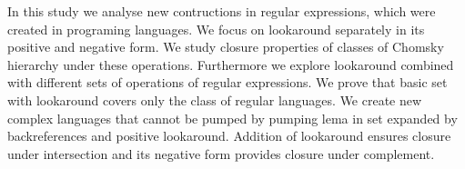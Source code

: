 \null
In this study we analyse new contructions in regular expressions, which were created in programing languages. We focus on lookaround separately in its positive and negative form. We study closure properties of classes of Chomsky hierarchy under these operations. Furthermore we explore lookaround combined with different sets of operations of regular expressions. We prove that basic set with lookaround covers only the class of regular languages. We create new complex languages that cannot be pumped by pumping lema in set expanded by backreferences and positive lookaround. Addition of lookaround ensures closure under intersection and its negative form provides closure under complement.